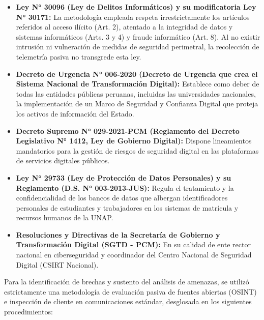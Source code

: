 \begin{itemize}[itemsep=3pt,topsep=3pt,parsep=0pt]
    \item \textbf{Ley N° 30096 (Ley de Delitos Informáticos) y su modificatoria Ley N° 30171:} La metodología empleada respeta irrestrictamente los artículos referidos al acceso ilícito (Art. 2), atentado a la integridad de datos y sistemas informáticos (Arts. 3 y 4) y fraude informático (Art. 8). Al no existir intrusión ni vulneración de medidas de seguridad perimetral, la recolección de telemetría pasiva no transgrede esta ley.
    
    \item \textbf{Decreto de Urgencia N° 006-2020 (Decreto de Urgencia que crea el Sistema Nacional de Transformación Digital):} Establece como deber de todas las entidades públicas peruanas, incluidas las universidades nacionales, la implementación de un Marco de Seguridad y Confianza Digital que proteja los activos de información del Estado.
    
    \item \textbf{Decreto Supremo N° 029-2021-PCM (Reglamento del Decreto Legislativo N° 1412, Ley de Gobierno Digital):} Dispone lineamientos mandatorios para la gestión de riesgos de seguridad digital en las plataformas de servicios digitales públicos.
    
    \item \textbf{Ley N° 29733 (Ley de Protección de Datos Personales) y su Reglamento (D.S. N° 003-2013-JUS):} Regula el tratamiento y la confidencialidad de los bancos de datos que albergan identificadores personales de estudiantes y trabajadores en los sistemas de matrícula y recursos humanos de la UNAP.
    
    \item \textbf{Resoluciones y Directivas de la Secretaría de Gobierno y Transformación Digital (SGTD - PCM):} En su calidad de ente rector nacional en ciberseguridad y coordinador del Centro Nacional de Seguridad Digital (CSIRT Nacional).
\end{itemize}

\clearpage


Para la identificación de brechas y sustento del análisis de amenazas, se utilizó estrictamente una metodología de evaluación pasiva de fuentes abiertas (OSINT) e inspección de cliente en comunicaciones estándar, desglosada en los siguientes procedimientos:

